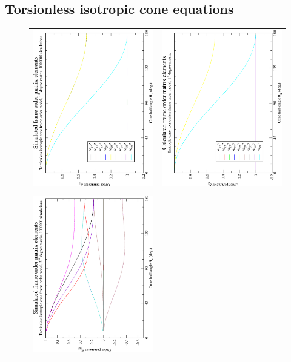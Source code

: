 \subsection{Torsionless isotropic cone equations}

\begin{figure}
\centering
  \begin{tabular}{@{}cc@{}}
    \includegraphics[width=.35\textwidth,angle=270]{images/frame_order_matrix/Sij_iso_cone_torsionless_in_frame_theta_x_ens1000000.eps} &
    \includegraphics[width=.35\textwidth,angle=270]{images/frame_order_matrix/Sij_iso_cone_torsionless_in_frame_theta_x_calc.eps} \\
    \\[-5pt]
    \includegraphics[width=.35\textwidth,angle=270]{images/frame_order_matrix/Sijkl_iso_cone_torsionless_in_frame_theta_x_ens1000000.eps} &

\end{tabular}
\end{figure}
